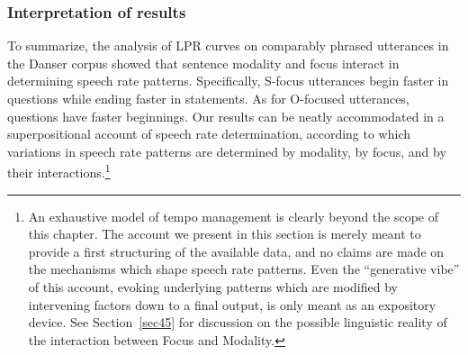 \subsubsection{Interpretation of results}\label{sec4442}
To summarize, the analysis of LPR curves on comparably phrased utterances in the Danser corpus showed that sentence modality and focus interact in determining speech rate patterns. Specifically, S-focus utterances begin faster in questions while ending faster in statements. As for O-focused utterances, questions have faster beginnings. Our results can be neatly accommodated in a superpositional account of speech rate determination, according to which variations in speech rate patterns are determined by modality, by focus, and by their interactions.\footnote{An exhaustive model of tempo management is clearly beyond the scope of this chapter. The account we present in this section is merely meant to provide a first structuring of the available data, and no claims are made on the mechanisms which shape speech rate patterns. Even the ``generative vibe'' of this account, evoking underlying patterns which are modified by intervening factors down to a final output, is only meant as an expository device. See Section~\ref{sec45} for discussion on the possible linguistic reality of the interaction between Focus and Modality.} 

